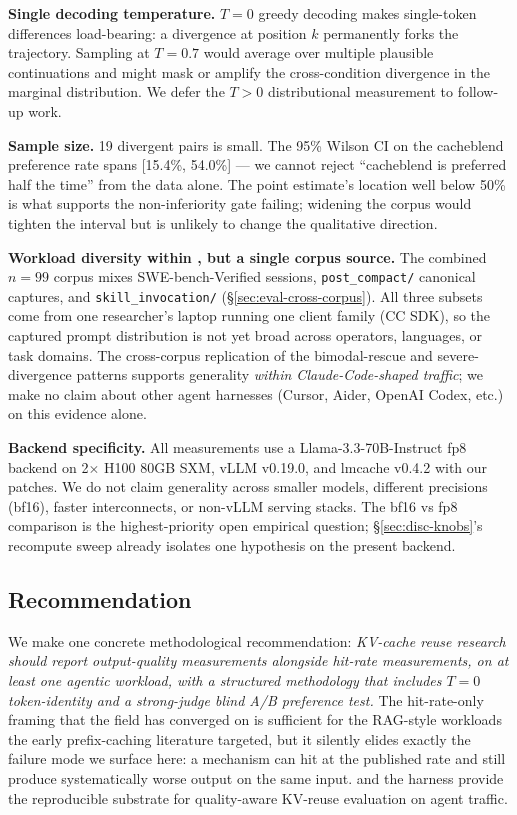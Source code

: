 \textbf{Single decoding temperature.} $T=0$ greedy decoding makes
single-token differences load-bearing: a divergence at position $k$
permanently forks the trajectory. Sampling at $T=0.7$ would average
over multiple plausible continuations and might mask or amplify the
cross-condition divergence in the marginal distribution. We defer
the $T>0$ distributional measurement to follow-up work.

\textbf{Sample size.} 19 divergent pairs is small. The 95\% Wilson CI
on the cacheblend preference rate spans [15.4\%, 54.0\%] --- we cannot
reject ``cacheblend is preferred half the time'' from the data alone.
The point estimate's location well below 50\% is what supports the
non-inferiority gate failing; widening the corpus would tighten the
interval but is unlikely to change the qualitative direction.

\textbf{Workload diversity within \dataset{}, but a single corpus
source.} The combined $n{=}99$ corpus mixes SWE-bench-Verified
sessions, \texttt{post\_compact/} canonical captures, and
\texttt{skill\_invocation/} (\S\ref{sec:eval-cross-corpus}). All three
subsets come from one researcher's laptop running one client family
(CC SDK), so the captured prompt distribution is not yet broad across
operators, languages, or task domains. The cross-corpus replication
of the bimodal-rescue and severe-divergence patterns supports
generality \emph{within Claude-Code-shaped traffic}; we make no claim
about other agent harnesses (Cursor, Aider, OpenAI Codex, etc.) on
this evidence alone.

\textbf{Backend specificity.} All measurements use a
Llama-3.3-70B-Instruct fp8 backend on 2$\times$ H100 80GB SXM, vLLM
v0.19.0, and lmcache v0.4.2 with our patches. We do not claim
generality across smaller models, different precisions (bf16),
faster interconnects, or non-vLLM serving stacks. The bf16 vs fp8
comparison is the highest-priority open empirical question;
\S\ref{sec:disc-knobs}'s recompute sweep already isolates one
hypothesis on the present backend.

\subsection{Recommendation}
\label{sec:disc-recommend}

We make one concrete methodological recommendation:
\emph{KV-cache reuse research should report output-quality measurements
alongside hit-rate measurements, on at least one agentic workload, with
a structured methodology that includes $T=0$ token-identity and a
strong-judge blind A/B preference test.} The hit-rate-only framing
that the field has converged on is sufficient for the RAG-style
workloads the early prefix-caching literature targeted, but it
silently elides exactly the failure mode we surface here: a mechanism
can hit at the published rate and still produce systematically worse
output on the same input. \dataset{} and the \sys{} harness provide
the reproducible substrate for quality-aware KV-reuse evaluation on
agent traffic.

